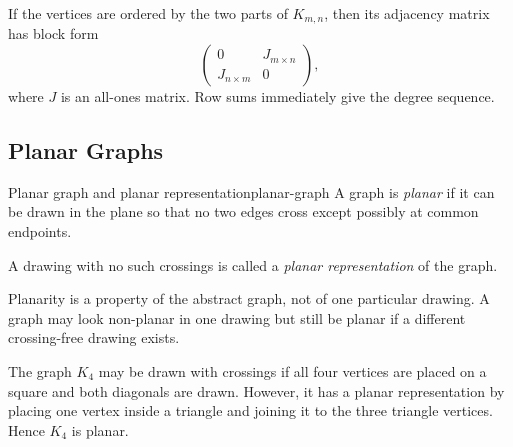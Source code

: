 \begin{extension}[title={Adjacency-matrix viewpoint}]
If the vertices are ordered by the two parts of \(K_{m,n}\), then its adjacency matrix has block form
\[
\begin{pmatrix}
0 & J_{m\times n}\\
J_{n\times m} & 0
\end{pmatrix},
\]
where \(J\) is an all-ones matrix. Row sums immediately give the degree sequence.
\end{extension}

\subsection{Planar Graphs}

\begin{definition}{Planar graph and planar representation}{planar-graph}
A graph is \emph{planar} if it can be drawn in the plane so that no two edges cross except possibly at common endpoints.

A drawing with no such crossings is called a \emph{planar representation} of the graph.
\end{definition}

Planarity is a property of the abstract graph, not of one particular drawing. A graph may look non-planar in one drawing but still be planar if a different crossing-free drawing exists.

\begin{examplebox}[title={\(K_4\) is planar}]
The graph \(K_4\) may be drawn with crossings if all four vertices are placed on a square and both diagonals are drawn. However, it has a planar representation by placing one vertex inside a triangle and joining it to the three triangle vertices. Hence \(K_4\) is planar.
\end{examplebox}

\begin{center}
\end{center}

